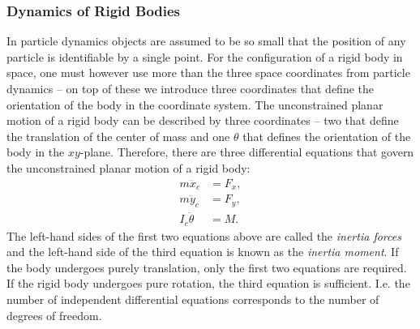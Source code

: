 \subsubsection{Dynamics of Rigid Bodies}
In particle dynamics objects are assumed to be so small that the position of any particle is identifiable by a single point. For the configuration of a rigid body in space, one must however use more than the three space coordinates from particle dynamics -- on top of these we introduce three coordinates that define the orientation of the body in the coordinate system. The unconstrained planar motion of a rigid body can be described by three coordinates -- two that define the translation of the center of mass and one $\theta$ that defines the orientation of the body in the $xy$-plane. Therefore, there are three differential equations that govern the unconstrained planar motion of a rigid body:
\begin{equation} \label{eq:eqmotrig2d}
  \begin{split}
    m \ddot{x}_{c} &= F_x, \\
    m \ddot{y}_c &= F_y, \\
    I_c \ddot{\theta} &= M.
  \end{split}
\end{equation}
The left-hand sides of the first two equations above are called the \textit{inertia forces} and the left-hand side of the third equation is known as the \textit{inertia moment}. If the body undergoes purely translation, only the first two equations are required. If the rigid body undergoes pure rotation, the third equation is sufficient. I.e. the number of independent differential equations corresponds to the number of degrees of freedom.


